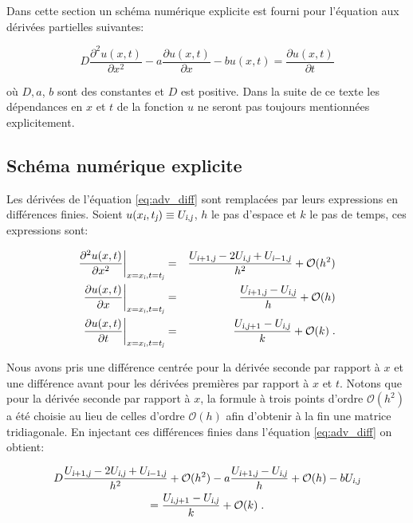 \documentclass[a4paper, 12pt]{report}
\begin{document}
Dans cette section un schéma numérique explicite est fourni pour l'équation
aux dérivées partielles suivantes:

\begin{equation}
D \frac{\partial^2 u(x,t)}{\partial x^2} - a \frac{\partial u(x,t)}{\partial x} - b u(x,t) = \frac{\partial u(x,t)}{\partial t}
\label{eq:adv_diff}
\end{equation}

où $D, a$, $b$ sont des constantes et $D$ est positive. Dans la suite de ce texte les dépendances en $x$ et $t$
de la fonction $u$ ne seront pas toujours mentionnées explicitement.

\subsection*{Schéma numérique explicite}

Les dérivées de l'équation \eqref{eq:adv_diff} sont remplacées par leurs expressions
en différences finies. Soient $u(x_{\textsl{i}}, t_{\textsl{j}}) \equiv U_{\textsl{i},\textsl{j}}$, $h$ le pas d'espace
et $k$ le pas de temps, ces expressions sont:

\begin{align}
  \frac{\partial^2 u (x,t)}{\partial x^2} \biggr |_{x=x_{\textsl{i}}, t=t_{\textsl{j}}} &=& \frac{U_{\textsl{i}+1,\textsl{j}} - 2 U_{\textsl{i},\textsl{j}} + U_{\textsl{i}-1,\textsl{j}}}{h^2} + \mathcal{O}(h^2)\\
  \frac{\partial u (x,t)}{\partial x} \biggr |_{x=x_{\textsl{i}}, t=t_{\textsl{j}}} &=& \frac{U_{\textsl{i}+1,\textsl{j}} - U_{\textsl{i},\textsl{j}}}{h} + \mathcal{O}(h)\\
  \frac{\partial u (x,t)}{\partial t} \biggr |_{x=x_{\textsl{i}}, t=t_{\textsl{j}}} &=& \frac{U_{\textsl{i},\textsl{j}+1} - U_{\textsl{i},\textsl{j}}}{k} + \mathcal{O}(k) \;.
\end{align}

Nous avons pris une différence centrée pour la dérivée seconde par rapport à $x$ et une différence avant pour les dérivées premières par rapport à $x$ et $t$. Notons que pour la dérivée seconde par rapport à $x$, la formule à trois points d'ordre $\mathcal{O}(h^2)$ a été choisie au lieu de celles d'ordre $\mathcal{O}(h)$ afin d'obtenir à la fin une matrice tridiagonale. En injectant ces différences finies dans l'équation \eqref{eq:adv_diff} on obtient:

\begin{multline}
D \frac{U_{\textsl{i}+1,\textsl{j}} - 2 U_{\textsl{i},\textsl{j}} + U_{\textsl{i}-1,\textsl{j}}}{h^2} + \mathcal{O}(h^2) - a \frac{U_{\textsl{i}+1,\textsl{j}} - U_{\textsl{i},\textsl{j}}}{h} + \mathcal{O}(h) - b U_{\textsl{i},\textsl{j}}\\
= \frac{U_{\textsl{i},\textsl{j}+1} - U_{\textsl{i},\textsl{j}}}{k} + \mathcal{O}(k) \;.
\end{multline}
\end{document}
